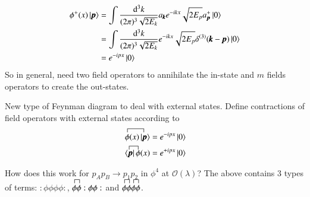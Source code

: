 \begin{align*}
	\phi^+(x) \ket{\pmb{p}} &= \int \frac{\dd^3 k}{(2\pi)^3 \sqrt{2E_k}} a_{\pmb{k}} e^{-ikx}\sqrt{2E_p} a^+_{\pmb{p}} \ket{0}\\
							&= \int \frac{\dd^3 k}{(2\pi)^3 \sqrt{2E_k}} e^{-ikx}\sqrt{2E_p} \delta^{(3)}(\pmb{k}-\pmb{p}) \ket{0}\\
							&= e^{-ipx} \ket{0}
\end{align*}
So in general, need two field operators to annihilate the in-state and $m$ fields operators to create the out-states.

New type of Feynman diagram to deal with external states. Define contractions of field operators with external states according to 
\begin{align*}
	\contraction{}{\phi}{(x)|}{\pmb{p}} \phi(x) \ket{\pmb{p}} &= e^{-ipx}\ket{0} \\%
	\contraction{\langle}{\pmb{p}}{|\;}{\phi} \bra{\pmb{p}}\phi(x)  &= e^{+ipx}\ket{0} 
\end{align*}

How does this work for $p_A p_B \rightarrow p_1 p_2$ in $\phi^4$ at $\mathcal{O}(\lambda)$? The above contains 3 types of terms: $:\phi\phi\phi\phi:$, $\contraction{}{\phi}{}{\phi}\phi\phi :\phi\phi:$ and $\contraction{}{\phi}{}{\phi}\phi\phi \contraction{}{\phi}{}{\phi}\phi\phi$.

